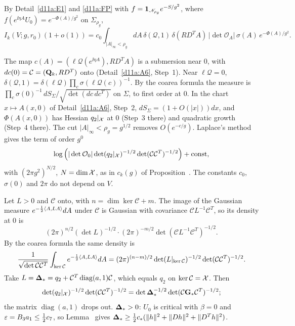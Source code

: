 \begin{detail}\label{d11a:E8}
\begin{step}
By Detail~\ref{d11a:E1} and \eqref{d11a:FP} with $f=\mathbf 1_{\mathscr N_{\rho_g}}e^{-S/g^2}$, where $f(e^{\ii\eta A}U_0)=e^{-\Phi(A)/g^2}$ on $\Sigma_{\rho_g}$,
\[
I_k(V;g,r_0)(1+o(1))=c_0\int_{|A|_\infty<\rho_g}dA\,\delta(\mathcal Q,1)\,\delta(RD^TA)\,|\det\mathcal O_A|\,\sigma(A)\,e^{-\Phi(A)/g^2}.
\]
\end{step}
\begin{step}
The map $c(A)=(\ell\mathcal Q(e^{\ii\eta A}),RD^TA)$ is a submersion near $0$, with $dc(0)=\mathcal C=(\mathbf Q_k,RD^T)$ onto (Detail~\ref{d11a:A6}, Step~1). Near $\ell\mathcal Q=0$, $\delta(\mathcal Q,1)=\delta(\ell\mathcal Q)\prod_c\sigma(\ell\mathcal Q(c))^{-1}$. By the coarea formula the measure is $\prod_c\sigma(0)^{-1}\,dS_\Sigma/\sqrt{\det(dc\,dc^T)}$ on $\Sigma$, to first order at $0$. In the chart $x\mapsto A(x,0)$ of Detail~\ref{d11a:A6}, Step~2, $dS_\Sigma=(1+O(|x|))dx$, and $\Phi(A(x,0))$ has Hessian $q_2|_\mathcal X$ at $0$ (Step~3 there) and quadratic growth (Step~4 there). The cut $|A|_\infty<\rho_g=g^{1/2}$ removes $O(e^{-c/g})$. Laplace's method gives the term of order $g^0$
\[
\log\Big(|\det\mathcal O_0|\det(q_2|_\mathcal X)^{-1/2}\det(\mathcal C\mathcal C^T)^{-1/2}\Big)+\mathrm{const},
\]
with $(2\pi g^2)^{N/2}$, $N=\dim\mathcal X$, as in $c_k(g)$ of Proposition~. The constants $c_0$, $\sigma(0)$ and $2\pi$ do not depend on $V$.
\end{step}
\begin{step}
Let $L>0$ and $\mathcal C$ onto, with $n=\dim\ker\mathcal C+m$. The image of the Gaussian measure $e^{-\frac12\langle A,LA\rangle}dA$ under $\mathcal C$ is Gaussian with covariance $\mathcal CL^{-1}\mathcal C^T$, so its density at $0$ is
\[
(2\pi)^{n/2}(\det L)^{-1/2}\cdot(2\pi)^{-m/2}\det(\mathcal CL^{-1}\mathcal C^T)^{-1/2}.
\]
By the coarea formula the same density is
\[
\frac{1}{\sqrt{\det\mathcal C\mathcal C^T}}\int_{\ker\mathcal C}e^{-\frac12\langle A,LA\rangle}dA=(2\pi)^{(n-m)/2}\det(L|_{\ker\mathcal C})^{-1/2}\det(\mathcal C\mathcal C^T)^{-1/2}.
\] Take $L=\boldsymbol{\Delta}_*=q_2+\mathcal C^T\operatorname{diag}(a,1)\mathcal C$, which equals $q_2$ on $\ker\mathcal C=\mathcal X$. Then
\[
\det(q_2|_\mathcal X)^{-1/2}\det(\mathcal C\mathcal C^T)^{-1/2}=\det\boldsymbol{\Delta}_*^{-1/2}\det(\mathcal C\mathbf G_*\mathcal C^T)^{-1/2};
\]
the matrix $\operatorname{diag}(a,1)$ drops out. $\boldsymbol{\Delta}_*>0$: $U_0$ is critical with $\beta=0$ and $\varepsilon=B_3a_1\le\frac12c_7$, so Lemma~ gives $\boldsymbol{\Delta}_*\ge\frac12c_*(\|h\|^2+\|Dh\|^2+\|D^Th\|^2)$.
\end{step}
\end{detail}

